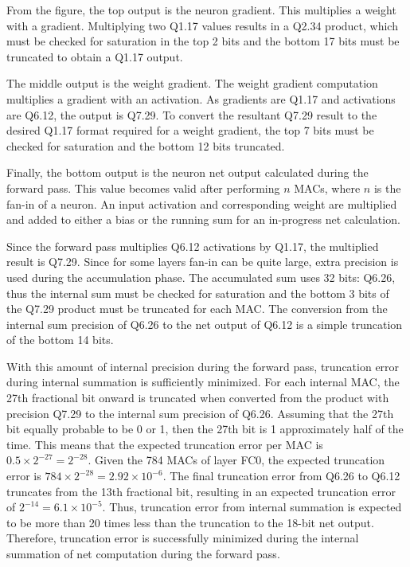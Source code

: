 From the figure, the top output is the neuron gradient. This multiplies a weight with a gradient. Multiplying two Q1.17 values results in a Q2.34 product, which must be checked for saturation in the top 2 bits and the bottom 17 bits must be truncated to obtain a Q1.17 output.

The middle output is the weight gradient. The weight gradient computation multiplies a gradient with an activation. As gradients are Q1.17 and activations are Q6.12, the output is Q7.29. To convert the resultant Q7.29 result to the desired Q1.17 format required for a weight gradient, the top 7 bits must be checked for saturation and the bottom 12 bits truncated. 

Finally, the bottom output is the neuron net output calculated during the forward pass. This value becomes valid after performing $n$ MACs, where $n$ is the fan-in of a neuron. An input activation and corresponding weight are multiplied and added to either a bias or the running sum for an in-progress net calculation. 

Since the forward pass multiplies Q6.12 activations by Q1.17, the multiplied result is Q7.29. Since for some layers fan-in can be quite large, extra precision is used during the accumulation phase. The accumulated sum uses 32 bits: Q6.26, thus the internal sum must be checked for saturation and the bottom 3 bits of the Q7.29 product must be truncated for each MAC. The conversion from the internal sum precision of Q6.26 to the net output of Q6.12 is a simple truncation of the bottom 14 bits.

With this amount of internal precision during the forward pass, truncation error during internal summation is sufficiently minimized. For each internal MAC, the 27th fractional bit onward is truncated when converted from the product with precision Q7.29 to the internal sum precision of Q6.26. Assuming that the 27th bit equally probable to be 0 or 1, then the 27th bit is 1 approximately half of the time. This means that the expected truncation error per MAC is $0.5 \times 2^{-27} = 2^{-28}$. Given the 784 MACs of layer FC0, the expected truncation error is $784 \times 2^{-28} = 2.92\times{10^{-6}}$. The final truncation error from Q6.26 to Q6.12 truncates from the 13th fractional bit, resulting in an expected truncation error of $2^{-14} = 6.1\times10^{-5}$. Thus, truncation error from internal summation is expected to be more than 20 times less than the truncation to the 18-bit net output. Therefore, truncation error is successfully minimized during the internal summation of net computation during the forward pass.

